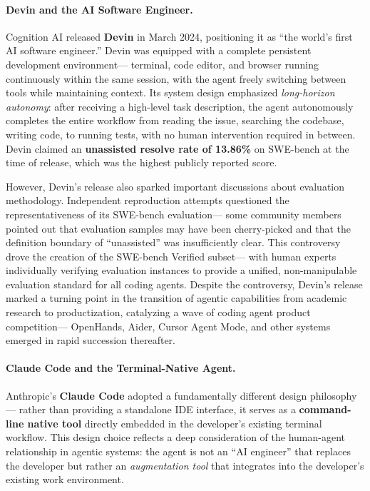 \paragraph{Devin and the AI Software Engineer.}
Cognition AI released \textbf{Devin} \citep{cognition2024devin} in March 2024,
positioning it as ``the world's first AI software engineer.''
Devin was equipped with a complete persistent development environment---
terminal, code editor, and browser running continuously within the same session,
with the agent freely switching between tools while maintaining context.
Its system design emphasized \emph{long-horizon autonomy}:
after receiving a high-level task description,
the agent autonomously completes the entire workflow from reading the issue, searching the codebase, writing code, to running tests,
with no human intervention required in between.
Devin claimed an \textbf{unassisted resolve rate of 13.86\%} on SWE-bench at the time of release,
which was the highest publicly reported score.

However, Devin's release also sparked important discussions about evaluation methodology.
Independent reproduction attempts questioned the representativeness of its SWE-bench evaluation---
some community members pointed out that evaluation samples may have been cherry-picked
and that the definition boundary of ``unassisted'' was insufficiently clear.
This controversy drove the creation of the SWE-bench Verified subset---
with human experts individually verifying evaluation instances
to provide a unified, non-manipulable evaluation standard for all coding agents.
Despite the controversy,
Devin's release marked a turning point in the transition of agentic capabilities from academic research to productization,
catalyzing a wave of coding agent product competition---
OpenHands, Aider, Cursor Agent Mode, and other systems emerged in rapid succession thereafter.

\paragraph{Claude Code and the Terminal-Native Agent.}
Anthropic's \textbf{Claude Code} \citep{anthropic2025claudecode}
adopted a fundamentally different design philosophy---
rather than providing a standalone IDE interface,
it serves as a \textbf{command-line native tool} directly embedded in the developer's existing terminal workflow.
This design choice reflects a deep consideration of the human-agent relationship in agentic systems:
the agent is not an ``AI engineer'' that replaces the developer
but rather an \emph{augmentation tool} that integrates into the developer's existing work environment.

